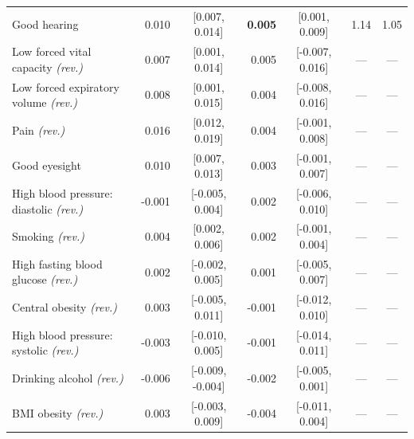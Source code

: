 \begin{longtable}{lrcrccc}
Good hearing & 0.010 & [0.007, 0.014] & \textbf{0.005} & [0.001, 0.009] & 1.14 & 1.05 \\
Low forced vital capacity \textit{(rev.)} & 0.007 & [0.001, 0.014] & 0.005 & [-0.007, 0.016] & --- & --- \\
Low forced expiratory volume \textit{(rev.)} & 0.008 & [0.001, 0.015] & 0.004 & [-0.008, 0.016] & --- & --- \\
Pain \textit{(rev.)} & 0.016 & [0.012, 0.019] & 0.004 & [-0.001, 0.008] & --- & --- \\
Good eyesight & 0.010 & [0.007, 0.013] & 0.003 & [-0.001, 0.007] & --- & --- \\
High blood pressure: diastolic \textit{(rev.)} & -0.001 & [-0.005, 0.004] & 0.002 & [-0.006, 0.010] & --- & --- \\
Smoking \textit{(rev.)} & 0.004 & [0.002, 0.006] & 0.002 & [-0.001, 0.004] & --- & --- \\
High fasting blood glucose \textit{(rev.)} & 0.002 & [-0.002, 0.005] & 0.001 & [-0.005, 0.007] & --- & --- \\
Central obesity \textit{(rev.)} & 0.003 & [-0.005, 0.011] & -0.001 & [-0.012, 0.010] & --- & --- \\
High blood pressure: systolic \textit{(rev.)} & -0.003 & [-0.010, 0.005] & -0.001 & [-0.014, 0.011] & --- & --- \\
Drinking alcohol \textit{(rev.)} & -0.006 & [-0.009, -0.004] & -0.002 & [-0.005, 0.001] & --- & --- \\
BMI obesity \textit{(rev.)} & 0.003 & [-0.003, 0.009] & -0.004 & [-0.011, 0.004] & --- & --- \\
\end{longtable}
